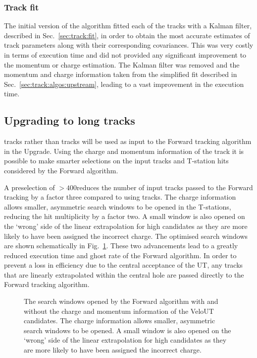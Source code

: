 \subsubsection{Track fit}

The initial version of the \velout algorithm fitted each of the \velout tracks with a Kalman filter, described in Sec.~\ref{sec:track:fit}, in order to obtain the most accurate estimates of track parameters along with their corresponding covariances. This was very costly in terms of execution time and did not provided any significant improvement to the momentum or charge estimation. The Kalman filter was removed and the momentum and charge information taken from the simplified fit described in Sec.~\ref{sec:track:algos:upstream}, leading to a vast improvement in the execution time.

\subsection{Upgrading to long tracks}

\velout tracks rather than \velo tracks will be used as input to the Forward tracking algorithm in the \lhcb Upgrade. Using the charge and momentum information of the \velout track it is possible to make smarter selections on the input tracks and T-station hits considered by the Forward algorithm. 

A preselection of \pt $>400$\mevc reduces the number of input tracks passed to the Forward tracking by a factor three compared to using \velo tracks. The charge information allows smaller, asymmetric search windows to be opened in the T-stations, reducing the hit multiplicity by a factor two. A small window is also opened on the `wrong' side of the linear extrapolation for high \pt candidates as they are more likely to have been assigned the incorrect charge. The optimised search windows are shown schematically in Fig.~\ref{fig:searchwindow}. These two advancements lead to a greatly reduced execution time and ghost rate of the Forward algorithm. In order to prevent a loss in efficiency due to the central acceptance of the UT, any \velo tracks that are linearly extrapolated within the central hole are passed directly to the Forward tracking algorithm.

\begin{figure}[!tb]

\caption{The search windows opened by the Forward algorithm with and without the charge and momentum information of the VeloUT candidates. The charge information allows smaller, asymmetric search windows to be opened. A small window is also opened on the `wrong' side of the linear extrapolation for high \pt candidates as they are more likely to have been assigned the incorrect charge.}
\label{fig:searchwindow}
\end{figure}

